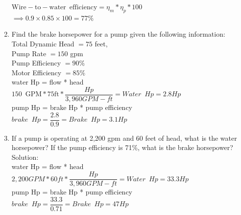 \documentclass{article}
\begin{document}
\begin{enumerate}
$\mathrm{Wire-to-water} \enspace \mathrm{efficiency}=\eta_m * \eta_p * 100$\\
$\implies 0.9 \times 0.85 \times 100=\boxed{77 \%}$

\newpage

  \item Find the brake horsepower for a pump given the following information:\\
   Total Dynamic Head $=75$ feet,\\
   Pump Rate $=150$ gpm\\
   Pump Efficiency $=90 \%$\\
   Motor Efficiency $=85 \%$\\
  \vspace{0.4cm}
water Hp = flow * head\\
$150 \enspace \mathrm{GPM}*75\mathrm{ft}*\dfrac{Hp}{3,960 GPM-ft}=\boxed{Water \enspace Hp = 2.8Hp}$\\
\vspace{0.4cm}
pump Hp = brake Hp * pump efficiency\\
$brake \enspace Hp = \dfrac{2.8}{0.9}=\boxed{Brake \enspace Hp=3.1Hp}$
 \vspace{0.2cm}
 
 
 


  \item If a pump is operating at 2,200 gpm and 60 feet of head, what is the water
horsepower? If the pump efficiency is 71\%, what is the brake horsepower?\\
  \vspace{0.2cm}
Solution:\\
\vspace{0.4cm}
water Hp = flow * head\\
$2,200GPM*60ft*\dfrac{Hp}{3,960 GPM-ft}=\boxed{Water \enspace Hp = 33.3Hp}$\\
\vspace{0.4cm}
pump Hp = brake Hp * pump efficiency\\
$brake \enspace Hp = \dfrac{33.3}{0.71}=\boxed{Brake \enspace Hp=47Hp}$
 \vspace{0.2cm}


\end{enumerate}
\end{document}
